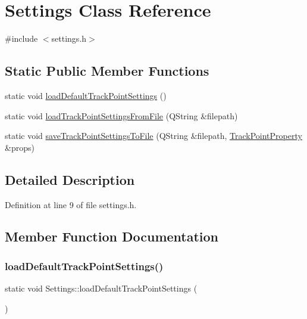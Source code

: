 \hypertarget{class_settings}{}\section{Settings Class Reference}
\label{class_settings}


{\ttfamily \#include $<$settings.\+h$>$}

\subsection*{Static Public Member Functions}
\begin{DoxyCompactItemize}
\item 
static void \mbox{\hyperlink{class_settings_a51dd47bc36fec3e735a48c7287e7bced}{load\+Default\+Track\+Point\+Settings}} ()
\item 
static void \mbox{\hyperlink{class_settings_ab88eeef4bd30306c8774f42f9c782ee0}{load\+Track\+Point\+Settings\+From\+File}} (Q\+String \&filepath)
\item 
static void \mbox{\hyperlink{class_settings_a6ed7797f46dd5c071828242363f0b69c}{save\+Track\+Point\+Settings\+To\+File}} (Q\+String \&filepath, \mbox{\hyperlink{struct_track_point_property}{Track\+Point\+Property}} \&props)
\end{DoxyCompactItemize}


\subsection{Detailed Description}


Definition at line 9 of file settings.\+h.



\subsection{Member Function Documentation}
\mbox{\label{class_settings_a51dd47bc36fec3e735a48c7287e7bced}} 
\subsubsection{\texorpdfstring{loadDefaultTrackPointSettings()}{loadDefaultTrackPointSettings()}}
{\footnotesize\ttfamily static void Settings\+::load\+Default\+Track\+Point\+Settings (\begin{DoxyParamCaption}{ }\end{DoxyParamCaption})\hspace{0.3cm}{\ttfamily [static]}}

